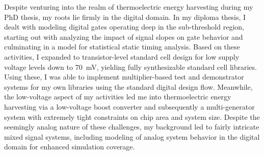 Despite venturing into the realm of thermoelectric energy harvesting during my PhD thesis, my roots lie firmly in the digital domain. 
In my diploma thesis, I dealt with modeling digital gates operating deep in the sub-threshold region, starting out with analyzing the impact of signal slopes on gate behavior and culminating in a model for statistical static timing analysis. Based on these activities, I expanded to transistor-level standard cell design for low supply voltage levels down to \SI{70}{\milli\volt}, yielding fully synthesizable standard cell libraries. Using  these, I was able to implement multiplier-based test and demonstrator systems for my own libraries using the standard digital design flow. Meanwhile, the low-voltage aspect of my activities led me into thermoelectric energy harvesting via a low-voltage boost converter and subsequently a multi-generator system with extremely tight constraints on chip area and system size. Despite the seemingly analog nature of these challenges, my background led to fairly intricate mixed signal systems, including modeling of analog system behavior in the digital domain for enhanced simulation coverage.\par%

